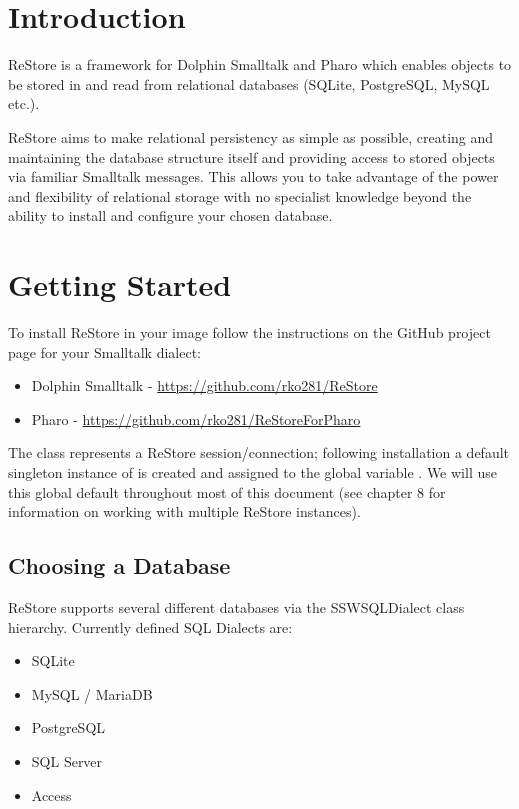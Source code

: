 \documentclass[10pt,twoside,english]{_support/latex/sbabook/sbabook}
\begin{document}
\frontmatter
\pagestyle{plain}

\tableofcontents*
\clearpage\listoffigures

\mainmatter

\chapter{Introduction }
ReStore is a framework for Dolphin Smalltalk and Pharo which enables objects to be stored in and read from relational databases (SQLite, PostgreSQL, MySQL etc.). 

ReStore aims to make relational persistency as simple as possible, creating and maintaining the database structure itself and providing access to stored objects via familiar Smalltalk messages. This allows you to take advantage of the power and flexibility of relational storage with no specialist knowledge beyond the ability to install and configure your chosen database.
\chapter{Getting Started}
To install ReStore in your image follow the instructions on the GitHub project page for your Smalltalk dialect:

\begin{itemize}
\item Dolphin Smalltalk - \url{https://github.com/rko281/ReStore}
\item Pharo - \url{https://github.com/rko281/ReStoreForPharo}
\end{itemize}

The class  represents a ReStore session/connection; following installation a default singleton instance of  is created and assigned to the global variable . We will use this global default throughout most of this document (see chapter 8 for information on working with multiple ReStore instances). 
\section{Choosing a Database}
ReStore supports several different databases via the SSWSQLDialect class hierarchy. Currently defined SQL Dialects are:

\begin{itemize}
\item SQLite
\item MySQL / MariaDB
\item PostgreSQL
\item SQL Server
\item Access
\end{itemize}
\end{document}
